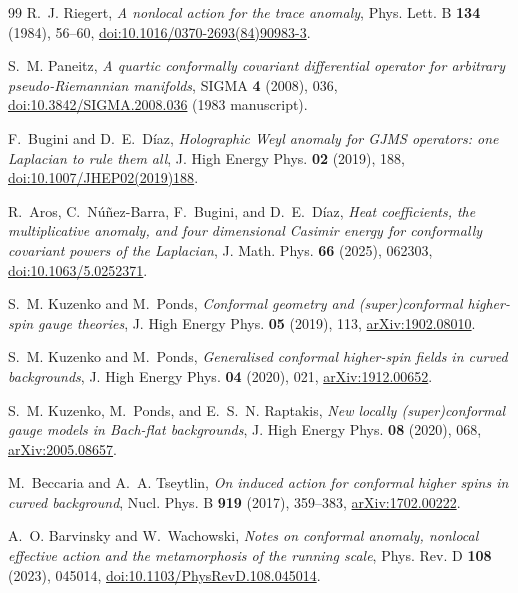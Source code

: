 \documentclass[11pt]{article}
\theoremstyle{definition}
\theoremstyle{remark}
\begin{document}
\begin{thebibliography}{99}
R.~J. Riegert,
\emph{A nonlocal action for the trace anomaly},
Phys. Lett. B \textbf{134} (1984), 56--60,
\href{https://doi.org/10.1016/0370-2693(84)90983-3}{doi:10.1016/0370-2693(84)90983-3}.

S.~M. Paneitz,
\emph{A quartic conformally covariant differential operator for arbitrary
pseudo-Riemannian manifolds},
SIGMA \textbf{4} (2008), 036,
\href{https://doi.org/10.3842/SIGMA.2008.036}{doi:10.3842/SIGMA.2008.036}
(1983 manuscript).

F.~Bugini and D.~E.~D\'iaz,
\emph{Holographic Weyl anomaly for GJMS operators: one Laplacian to rule
them all},
J. High Energy Phys. \textbf{02} (2019), 188,
\href{https://doi.org/10.1007/JHEP02(2019)188}
{doi:10.1007/JHEP02(2019)188}.

R.~Aros, C.~N\'u\~nez-Barra, F.~Bugini, and D.~E.~D\'iaz,
\emph{Heat coefficients, the multiplicative anomaly, and four dimensional
Casimir energy for conformally covariant powers of the Laplacian},
J. Math. Phys. \textbf{66} (2025), 062303,
\href{https://doi.org/10.1063/5.0252371}{doi:10.1063/5.0252371}.

S.~M. Kuzenko and M.~Ponds,
\emph{Conformal geometry and (super)conformal higher-spin gauge theories},
J. High Energy Phys. \textbf{05} (2019), 113,
\href{https://arxiv.org/abs/1902.08010}{arXiv:1902.08010}.

S.~M. Kuzenko and M.~Ponds,
\emph{Generalised conformal higher-spin fields in curved backgrounds},
J. High Energy Phys. \textbf{04} (2020), 021,
\href{https://arxiv.org/abs/1912.00652}{arXiv:1912.00652}.

S.~M. Kuzenko, M.~Ponds, and E.~S.~N. Raptakis,
\emph{New locally (super)conformal gauge models in Bach-flat backgrounds},
J. High Energy Phys. \textbf{08} (2020), 068,
\href{https://arxiv.org/abs/2005.08657}{arXiv:2005.08657}.

M.~Beccaria and A.~A. Tseytlin,
\emph{On induced action for conformal higher spins in curved background},
Nucl. Phys. B \textbf{919} (2017), 359--383,
\href{https://arxiv.org/abs/1702.00222}{arXiv:1702.00222}.

A.~O. Barvinsky and W.~Wachowski,
\emph{Notes on conformal anomaly, nonlocal effective action and the
metamorphosis of the running scale},
Phys. Rev. D \textbf{108} (2023), 045014,
\href{https://doi.org/10.1103/PhysRevD.108.045014}
{doi:10.1103/PhysRevD.108.045014}.


\end{thebibliography}
\end{document}
